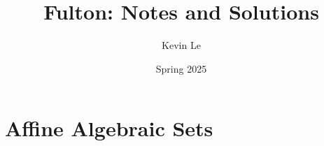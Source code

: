 \documentclass[openany,11pt]{book}
\title{Fulton: Notes and Solutions}
\author{Kevin Le}
\date{Spring 2025}
\begin{document}
\maketitle
\nirtableofcontents
\chapter{Affine Algebraic Sets}

\nirprintindex
\end{document}
